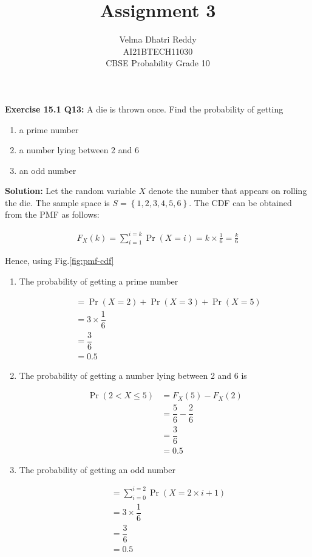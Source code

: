 \documentclass[journal,11pt,twocolumn]{IEEEtran}
\title{Assignment 3}
\author{Velma Dhatri Reddy \\ \normalsize AI21BTECH11030 \\ \vspace*{10pt} \Large CBSE Probability Grade 10}
\providecommand{\pr}[1]{\ensuremath{\Pr\left(#1\right)}}
\providecommand{\cbrak}[1]{\ensuremath{\left\{#1\right\}}}
\providecommand{\cdf}[2]{\ensuremath{F_{#1}\left(#2\right)}}
\begin{document}
\maketitle
\textbf{Exercise 15.1 Q13:}
A die is thrown once. Find the probability of getting	\begin{enumerate}[label=(\roman*)]
		\item a prime number
		\item a number lying between 2 and 6
		\item an odd number
\end{enumerate}

\textbf{Solution:} Let the random variable $X$ denote the number that appears on rolling the die. The sample space is $S = \cbrak{1, 2, 3, 4, 5, 6}$. The CDF can be obtained from the PMF as follows:

\begin{align}
    \cdf{X}{k} = \sum_{i = 1}^{i = k}\pr{X = i} = k \times \frac{1}{6} = \frac{k}{6}
\label{cdf}
\end{align}

Hence, using Fig.\ref{fig:pmf-cdf}

\begin{enumerate}[label=(\roman*)]

	\item The probability of getting a prime number  
	
\begin{align}
    &= \pr{X=2} + \pr{X=3} + \pr{X=5}\\
    &= 3\times \dfrac{1}{6}\\
    &= \dfrac{3}{6}\\
    &= 0.5
\end{align}

	\item The probability of getting a number lying between 2 and 6 is
	
\begin{align}
    \pr{2 < X \leq 5} &= \cdf{X}{5} - \cdf{X}{2}\\
    &= \dfrac{5}{6} - \dfrac{2}{6}\\
    &= \dfrac{3}{6}\\
    &= 0.5
\end{align}

	\item The probability of getting an odd number
	
\begin{align}
    &= \sum_{i = 0}^{i = 2}\pr{X = 2\times i + 1}\\
    &= 3\times \dfrac{1}{6}\\
    &= \dfrac{3}{6}\\
    &= 0.5
\end{align}

\end{enumerate}
\end{document}
